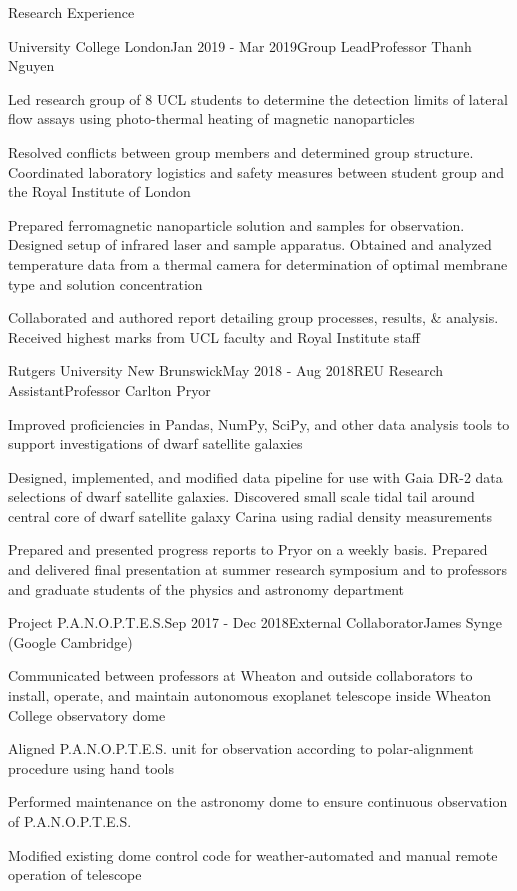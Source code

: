 \documentclass{resume} %
\begin{document}
\begin{rSection}{Research Experience}
\begin{rSubsection}{University College London}{Jan 2019 - Mar 2019}{Group Lead}{Professor Thanh Nguyen}
\item Led research group of 8 UCL students to determine the detection limits of lateral flow assays using photo-thermal heating of magnetic nanoparticles
\item Resolved conflicts between group members and determined group structure. Coordinated laboratory logistics and safety measures between student group and the Royal Institute of London
\item Prepared ferromagnetic nanoparticle solution and samples for observation. Designed setup of infrared laser and sample apparatus. Obtained and analyzed temperature data from a thermal camera for determination of optimal membrane type and solution concentration
\item Collaborated and authored report detailing group processes, results, \& analysis. Received highest marks from UCL faculty and Royal Institute staff
\end{rSubsection}

\begin{rSubsection}{Rutgers University New Brunswick}{May 2018 - Aug 2018}{REU Research Assistant}{Professor Carlton Pryor}
\item Improved proficiencies in Pandas, NumPy, SciPy, and other data analysis tools to support investigations of dwarf satellite galaxies
\item Designed, implemented, and modified data pipeline for use with Gaia DR-2 data selections of dwarf satellite galaxies. Discovered small scale tidal tail around central core of dwarf satellite galaxy Carina using radial density measurements
\item Prepared and presented progress reports to Pryor on a weekly basis. Prepared and delivered final presentation at summer research symposium and to professors and graduate students of the physics and astronomy department
\end{rSubsection}

\begin{rSubsection}{Project P.A.N.O.P.T.E.S.}{Sep 2017 - Dec 2018}{External Collaborator}{James Synge (Google Cambridge)}
\item Communicated between professors at Wheaton and outside collaborators to install, operate, and maintain autonomous exoplanet telescope inside Wheaton College observatory dome
\item Aligned P.A.N.O.P.T.E.S. unit for observation according to polar-alignment procedure using hand tools
\item Performed maintenance on the astronomy dome to ensure continuous observation of P.A.N.O.P.T.E.S.
\item Modified existing dome control code for weather-automated and manual remote operation of telescope
\end{rSubsection}


\end{rSection}
\end{document}
